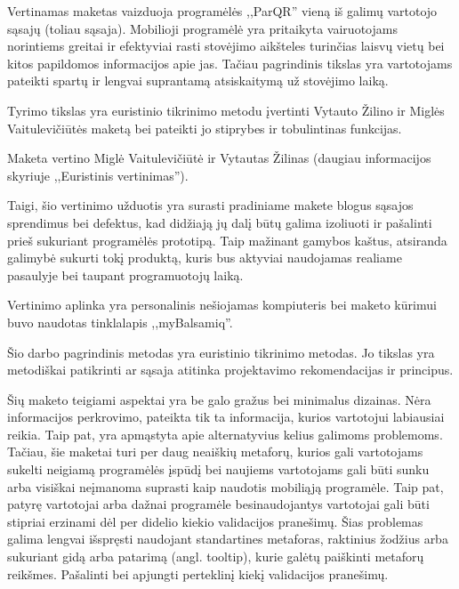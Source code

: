 \documentclass{VUMIFPSkursinis}
\begin{document}

Vertinamas maketas vaizduoja programėlės ,,ParQR'' vieną iš galimų vartotojo sąsajų (toliau sąsaja).
Mobilioji programėlė yra pritaikyta vairuotojams norintiems greitai ir 
efektyviai rasti stovėjimo aikšteles turinčias laisvų vietų bei kitos 
papildomos informacijos apie jas. Tačiau pagrindinis tikslas yra 
vartotojams pateikti spartų ir lengvai suprantamą atsiskaitymą už 
stovėjimo laiką.

\vspace{5mm}
Tyrimo tikslas yra euristinio tikrinimo metodu įvertinti Vytauto Žilino ir Miglės Vaitulevičiūtės maketą bei pateikti jo stiprybes ir tobulintinas funkcijas.

Maketa vertino Miglė Vaitulevičiūtė ir Vytautas Žilinas (daugiau informacijos skyriuje ,,Euristinis vertinimas'').

\vspace{5mm}
Taigi, šio vertinimo užduotis yra surasti pradiniame makete blogus sąsajos sprendimus bei defektus, kad didžiają jų dalį būtų galima 
izoliuoti ir pašalinti prieš sukuriant programėlės prototipą. Taip mažinant gamybos kaštus, atsiranda galimybė sukurti tokį produktą,
kuris bus aktyviai naudojamas realiame pasaulyje bei taupant programuotojų laiką.

Vertinimo aplinka yra personalinis nešiojamas kompiuteris bei maketo kūrimui buvo naudotas tinklalapis ,,myBalsamiq''.

Šio darbo pagrindinis metodas yra euristinio tikrinimo metodas. Jo tikslas yra metodiškai patikrinti ar sąsaja atitinka
projektavimo rekomendacijas ir principus.

\vspace{5mm}
Šių maketo teigiami aspektai yra be galo gražus bei minimalus dizainas. Nėra informacijos perkrovimo, pateikta tik ta informacija, kurios vartotojui labiausiai reikia.
Taip pat, yra apmąstyta apie alternatyvius kelius galimoms problemoms.
Tačiau, šie maketai turi per daug neaiškių metaforų, kurios gali vartotojams sukelti neigiamą programėlės įspūdį bei naujiems vartotojams gali būti sunku arba
visiškai neįmanoma suprasti kaip naudotis mobiliąją programėle. Taip pat, patyrę vartotojai arba dažnai programėle besinaudojantys vartotojai gali būti stipriai erzinami
dėl per didelio kiekio validacijos pranešimų.
Šias problemas galima lengvai išspręsti naudojant standartines metaforas, raktinius žodžius arba sukuriant gidą arba patarimą (angl. tooltip), kurie galėtų paiškinti metaforų reikšmes.
Pašalinti bei apjungti perteklinį kiekį validacijos pranešimų.
 
\end{document}

